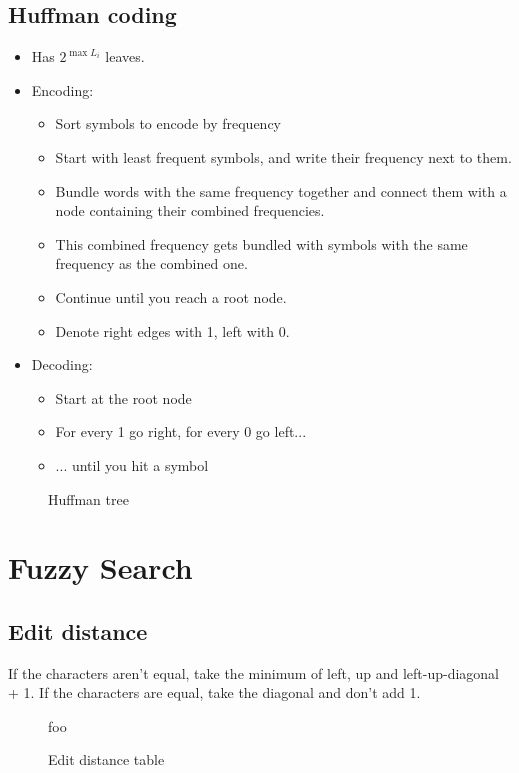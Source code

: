 \documentclass[a4paper]{scrartcl}
\begin{document}
\subsection{Huffman coding}
\label{sec:huffman_coding}
\begin{itemize}
\item Has $2^{\max L_i}$ leaves.
\item Encoding:
  \begin{itemize}
  \item Sort symbols to encode by frequency
  \item Start with least frequent symbols, and write their frequency next to
    them.
  \item Bundle words with the same frequency together and connect them with a
    node containing their combined frequencies.
  \item This combined frequency gets bundled with symbols with the same
    frequency as the combined one.
  \item Continue until you reach a root node.
  \item Denote right edges with 1, left with 0.
  \end{itemize}
\item Decoding:
  \begin{itemize}
  \item Start at the root node
  \item For every 1 go right, for every 0 go left...
  \item ... until you hit a symbol
  \end{itemize}
\end{itemize}
\begin{figure}[!htbp]
  \centering
  
  \caption{Huffman tree}
  \label{fig:huffman_tree}
\end{figure}

\section{Fuzzy Search}
\label{sec:fuzzy_search}

\subsection{Edit distance}
\label{sec:edit_distance}
If the characters aren't equal, take the minimum of left, up and
left-up-diagonal + 1. If the characters are equal, take the diagonal and don't
add 1.
\begin{figure}[!htbp]
  \centering
  foo
  \caption{Edit distance table}
  \label{fig:edit_distance}
\end{figure}
\end{document}
